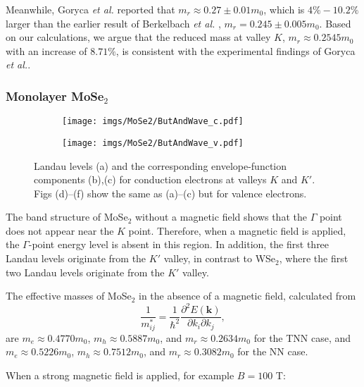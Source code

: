 \documentclass{article}
\begin{document}
Meanwhile, Goryca \textit{et al.} \cite{goryca2019} reported that $m_{r} \approx 0.27 \pm 0.01 m_{0}$, which is $4\%-10.2\%$ larger than the earlier result of Berkelbach \textit{et al.} \cite{berkelbach2013}, $m_{r} = 0.245 \pm 0.005 m_{0}$.  
Based on our calculations, we argue that the reduced mass at valley $K$, $m_{r} \approx 0.2545 m_{0}$ with an increase of $8.71\%$, is consistent with the experimental findings of Goryca \textit{et al.}.


\newpage
\subsubsection*{Monolayer MoSe$_{2}$}
\begin{figure}[htb]
	\begin{subfigure}{0.495\textwidth}
		\centering
		\texttt{[image: imgs/MoSe2/ButAndWave\_c.pdf]}
	\end{subfigure}
	\begin{subfigure}{0.495\textwidth}
		\centering
		\texttt{[image: imgs/MoSe2/ButAndWave\_v.pdf]}
	\end{subfigure}
	\caption{Landau levels (a) and the corresponding envelope-function components (b),(c) for conduction electrons at valleys $K$ and $K'$. Figs (d)–(f) show the same as (a)–(c) but for valence electrons.}
\end{figure}
The band structure of MoSe$_{2}$ without a magnetic field shows that the $\Gamma$ point does not appear near the $K$ point. Therefore, when a magnetic field is applied, the $\Gamma$-point energy level is absent in this region. In addition, the first three Landau levels originate from the $K'$ valley, in contrast to WSe$_{2}$, where the first two Landau levels originate from the $K'$ valley.  

The effective masses of MoSe$_{2}$ in the absence of a magnetic field, calculated from
\[
\frac{1}{m_{ij}^{*}} = \frac{1}{\hbar^{2}} \frac{\partial^{2} E(\mathbf{k})}{\partial k_{i}\partial k_{j}},
\]
are $m_{e} \approx 0.4770 m_{0}$, $m_{h} \approx 0.5887 m_{0}$, and $m_{r} \approx 0.2634 m_{0}$ for the TNN case, and $m_{e} \approx 0.5226 m_{0}$, $m_{h} \approx 0.7512 m_{0}$, and $m_{r} \approx 0.3082 m_{0}$ for the NN case.  

When a strong magnetic field is applied, for example $B = 100$ T:  
\end{document}

